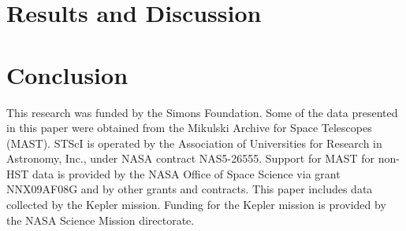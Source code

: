 \documentclass[useAMS, usenatbib, preprint, 12pt]{aastex}
\begin{document}



\section{Results and Discussion}



\section{Conclusion}


This research was funded by the Simons Foundation.
Some of the data presented in this paper were obtained from the Mikulski
Archive for Space Telescopes (MAST).
STScI is operated by the Association of Universities for Research in
Astronomy, Inc., under NASA contract NAS5-26555.
Support for MAST for non-HST data is provided by the NASA Office of Space
Science via grant NNX09AF08G and by other grants and contracts.
This paper includes data collected by the Kepler mission. Funding for the
Kepler mission is provided by the NASA Science Mission directorate.



\end{document}
